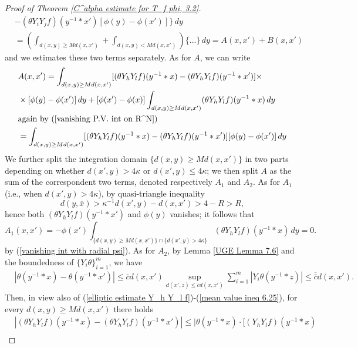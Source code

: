 \documentclass{article}
\numberwithin{equation}{section}
\begin{document}
\begin{proof}[Proof of Theorem \ref{C^alpha estimate for T_f phi, 3.2}]
\begin{align*}
        & -(\theta Y_i Y_j f)(y^{-1}*x')[\phi(y)-\phi(x')]\} \, dy \\
        & = \left(\int_{d(x,y) \geq Md(x,x')} + \int_{d(x,y)<Md(x,x')} \right) \{...\} \, dy = A(x,x')+B(x,x') 
    \end{align*}
    and we estimates these two terms separately. As for $A$, we can write
    \begin{align*}
        & A(x,x')=\int_{d(x,y) \geq Md(x,x')} [(\theta Y_h Y_l f)(y^{-1}*x)-(\theta Y_h Y_l f)(y^{-1}*x')] \times \\
        & \times [\phi(y)-\phi(x')] \, dy + [\phi(x')-\phi(x)] \int_{d(x,y) \geq Md(x,x')} (\theta Y_h Y_l f)(y^{-1}*x) \, dy
        \\
        & \text{again by (\ref{vanishing P.V. int on R^N})}
        \\
        & = \int_{d(x,y) \geq Md(x,x')} [(\theta Y_h Y_l f)(y^{-1}*x)-(\theta Y_h Y_l f)(y^{-1}*x')][\phi(y)-\phi(x')]\, dy
    \end{align*}
    We further split the integration domain $\{d(x,y) \geq Md(x,x')\}$ in two parts depending on whether $d(x',y)>4\kappa$ or $d(x',y) \leq 4\kappa$; we then split $A$ as the sum of the correspondent two terms, denoted respectively $A_1$ and $A_2$. As for $A_1$ (i.e., when $d(x',y)>4\kappa$), by quasi-triangle inequality
    \begin{equation*}
        d(y,\overline{x})>\kappa^{-1}d(x',y)-d(x,x')>4-R>R,
    \end{equation*}
    hence both $(\theta Y_h Y_l f)(y^{-1}*x')$ and $\phi(y)$ vanishes; it follows that
    \begin{equation*}
        A_1(x,x') = -\phi(x') \int_{\{d(x,y) \geq Md(x,x')\} \cap \{d(x',y)>4\kappa\}} (\theta Y_h Y_l f)(y^{-1}*x) \, dy = 0.
    \end{equation*}
    by (\ref{vanishing int with radial psi}). As for $A_2$, by Lemma \ref{UGE Lemma 7.6} and the boundedness of $\{Y_i \theta\}_{i=1}^m$, we have
    \begin{align*}
        & |\theta(y^{-1}*x)-\theta(y^{-1}*x')| \leq \overline{c}d(x,x') \sup_{d(x',z) \leq \overline{c} d(x,x')} \sum_{i=1}^m |Y_i \theta(y^{-1} * z)| \leq \overline{\overline{c}} d(x,x').
    \end{align*}
    Then, in view also of (\ref{elliptic estimate Y_h Y_l f})-(\ref{mean value ineq 6.25}), for every $d(x,y) \geq Md(x,x')$ there holds
    \begin{align*}
        & |(\theta Y_h Y_l f)(y^{-1}*x)-(\theta Y_h Y_l f)(y^{-1}*x')| \leq |\theta(y^{-1}*x) \cdot [(Y_h Y_l f)(y^{-1}*x)\\

\end{align*}
\end{proof}
\end{document}
